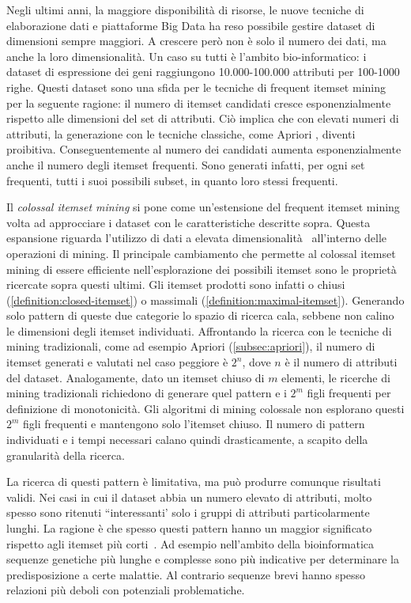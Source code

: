 Negli ultimi anni, la maggiore disponibilità di risorse, le nuove tecniche di elaborazione dati e piattaforme Big Data ha reso possibile gestire dataset di dimensioni sempre maggiori.
A crescere però non è solo il numero dei dati, ma anche la loro dimensionalità.
Un caso su tutti è l'ambito bio-informatico: i dataset di espressione dei geni raggiungono 10.000-100.000 attributi per 100-1000 righe.
Questi dataset sono una sfida per le tecniche di frequent itemset mining per la seguente ragione:
il numero di itemset candidati cresce esponenzialmente rispetto alle dimensioni del set di attributi.
Ciò implica che con elevati numeri di attributi, la generazione con le tecniche classiche, come Apriori \cite{agarwal2001tree}, diventi proibitiva.
Conseguentemente al numero dei candidati aumenta esponenzialmente anche il numero degli itemset frequenti.
Sono generati infatti, per ogni set frequenti, tutti i suoi possibili subset, in quanto loro stessi frequenti.

Il \textit{colossal itemset mining} si pone come un'estensione del frequent itemset mining volta ad approcciare i dataset con le caratteristiche descritte sopra.
Questa espansione riguarda l'utilizzo di dati a elevata dimensionalità~\cite{zhu2007mining} all'interno delle operazioni di mining.
Il principale cambiamento che permette al colossal itemset mining di essere efficiente nell'esplorazione dei possibili itemset sono le proprietà ricercate sopra questi ultimi.
Gli itemset prodotti sono infatti o chiusi (\cref{definition:closed-itemset}) o massimali (\cref{definition:maximal-itemset}).
Generando solo pattern di queste due categorie lo spazio di ricerca cala, sebbene non calino le dimensioni degli itemset individuati.
Affrontando la ricerca con le tecniche di mining tradizionali, come ad esempio Apriori (\cref{subsec:apriori}), il numero di itemset generati e valutati nel caso peggiore è \(2^n\), dove \(n\) è il numero di attributi del dataset.
Analogamente, dato un itemset chiuso di \(m\) elementi, le ricerche di mining tradizionali richiedono di generare quel pattern e i \(2^m\) figli frequenti per definizione di monotonicità.
Gli algoritmi di mining colossale non esplorano questi  \(2^m\) figli frequenti e mantengono solo l'itemset chiuso.
Il numero di pattern individuati e i tempi necessari calano quindi drasticamente, a scapito della granularità della ricerca.

La ricerca di questi pattern è limitativa, ma può produrre comunque risultati validi. 
Nei casi in cui il dataset abbia un numero elevato di attributi, molto spesso sono ritenuti ``interessanti' solo i gruppi di attributi particolarmente lunghi.
La ragione è che spesso questi pattern hanno un maggior significato rispetto agli itemset più corti~\cite{zhu2007mining}.
Ad esempio nell'ambito della bioinformatica sequenze genetiche più lunghe e complesse sono più indicative per determinare la predisposizione a certe malattie.
Al contrario sequenze brevi hanno spesso relazioni più deboli con potenziali problematiche.
